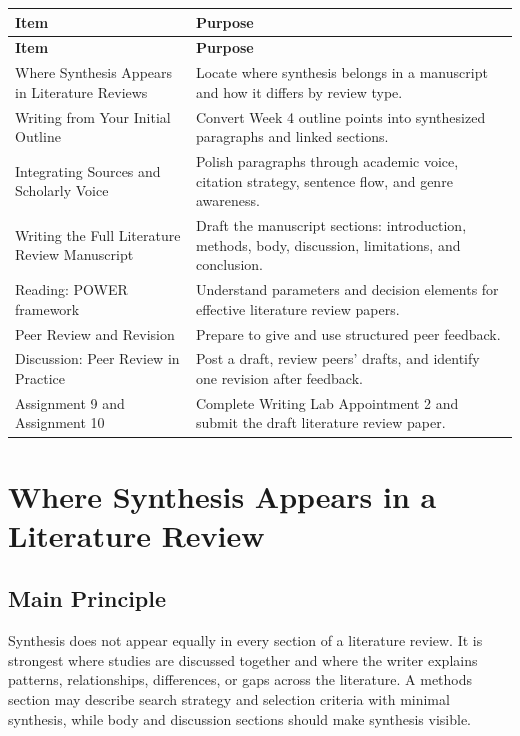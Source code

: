 \documentclass[10pt,letterpaper]{article}
\begin{document}
\begin{longtable}{L{4.8cm} L{8.8cm}}
\toprule
{}
\textbf{Item} & \textbf{Purpose}\\
\midrule
\endfirsthead
\toprule
{}
\textbf{Item} & \textbf{Purpose}\\
\midrule
\endhead
\bottomrule
\endfoot
Where Synthesis Appears in Literature Reviews & Locate where synthesis belongs in a manuscript and how it differs by review type.\\
Writing from Your Initial Outline & Convert Week 4 outline points into synthesized paragraphs and linked sections.\\
Integrating Sources and Scholarly Voice & Polish paragraphs through academic voice, citation strategy, sentence flow, and genre awareness.\\
Writing the Full Literature Review Manuscript & Draft the manuscript sections: introduction, methods, body, discussion, limitations, and conclusion.\\
Reading: POWER framework & Understand parameters and decision elements for effective literature review papers.\\
Peer Review and Revision & Prepare to give and use structured peer feedback.\\
Discussion: Peer Review in Practice & Post a draft, review peers' drafts, and identify one revision after feedback.\\
Assignment 9 and Assignment 10 & Complete Writing Lab Appointment 2 and submit the draft literature review paper.\\
\end{longtable}

\section{Where Synthesis Appears in a Literature Review}

\subsection{Main Principle}

Synthesis does not appear equally in every section of a literature review. It is strongest where studies are discussed together and where the writer explains patterns, relationships, differences, or gaps across the literature. A methods section may describe search strategy and selection criteria with minimal synthesis, while body and discussion sections should make synthesis visible.
\end{document}
